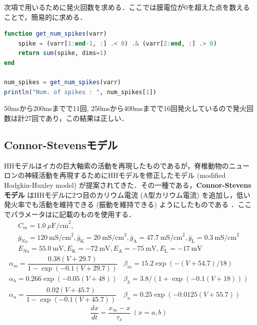 次項で用いるために発火回数を求める．ここでは膜電位が0を超えた点を数えることで，簡易的に求める．
\begin{lstlisting}[language=julia]
function get_num_spikes(varr)
    spike = (varr[1:end-1, :] .< 0) .& (varr[2:end, :] .> 0)
    return sum(spike, dims=1)
end

num_spikes = get_num_spikes(varr)
println("Num. of spikes : ", num_spikes[1])
\end{lstlisting}
50msから200msまでで11回, 250msから400msまでで16回発火しているので発火回数は計27回であり，この結果は正しい．
\subsection{Connor-Stevensモデル}
HHモデルはイカの巨大軸索の活動を再現したものであるが，脊椎動物のニューロンの神経活動を再現するためにHHモデルを修正したモデル (modified Hodgkin-Huxley model) が提案されてきた．その一種である，\textbf{Connor-Stevensモデル} はHHモデルに2つ目のカリウム電流 (A型カリウム電流) を追加し，低い発火率でも活動を維持できる (振動を維持できる) ようにしたものである \citep{Connor1971-rs,Connor1977-qo}．ここでパラメータは\citep{Dayan2005-ib}に記載のものを使用する．
\begin{equation}
\begin{array}{l}
C_m=1.0\ \mu\textrm{F/cm}^2,\\ 
\bar{g}_{\text{Na}}=120\ \textrm{mS/cm}^2, \bar{g}_{\text{K}}=20\ \textrm{mS/cm}^2, \bar{g}_{\text{A}}=47.7\ \textrm{mS/cm}^2, \bar{g}_{\text{L}}=0.3\ \textrm{mS/cm}^2\\
E_{\text{Na}}=55.0\ \textrm{mV}, E_{\text{K}}=-72\ \textrm{mV}, E_{\text{A}}=-75\ \textrm{mV},E_{\text{L}}=-17\ \textrm{mV} 
\end{array}
\end{equation}
\begin{equation}
\begin{array}{ll}
\alpha_m=\dfrac{0.38(V+29.7)}{1-\exp (-0.1(V+29.7))} & \beta_m=15.2 \exp (-(V+54.7)/18) \\
\alpha_h=0.266 \exp (-0.05(V+48)) & \beta_h=3.8 /(1+\exp (-0.1(V+18))) \\ 
\alpha_n=\dfrac{0.02(V+45.7)}{1-\exp (-0.1(V+45.7))} & \beta_n=0.25 \exp (-0.0125(V+55.7))
\end{array}
\end{equation}
\begin{equation}
\frac{dx}{dt}=\frac{x_\infty-x}{\tau_x}\ (x=a, b)
\end{equation}
